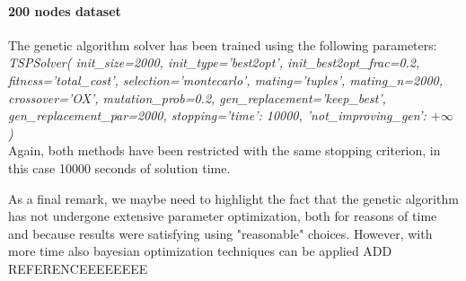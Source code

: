 \documentclass{article}
\begin{document}
\paragraph*{200 nodes dataset}
The genetic algorithm solver has been trained using the following parameters: \\
\newline
\textit{TSPSolver(
    init\_size=2000, init\_type='best2opt', init\_best2opt\_frac=0.2, fitness='total\_cost',
    selection='montecarlo', mating='tuples', mating\_n=2000, crossover='OX', mutation\_prob=0.2,
    gen\_replacement='keep\_best', gen\_replacement\_par=2000,
    stopping={'time': 10000, 'not\_improving\_gen': $+\infty$}
)} \\
\newline
Again, both methods have been restricted with the same stopping criterion, in this case 10000 seconds of solution time.


\null \newline
As a final remark, we maybe need to highlight the fact that the genetic algorithm has not undergone extensive parameter optimization, both for reasons of time and because results were satisfying using "reasonable" choices. However, with more time also bayesian optimization techniques can be applied ADD REFERENCEEEEEEEE




\newpage


\end{document}
